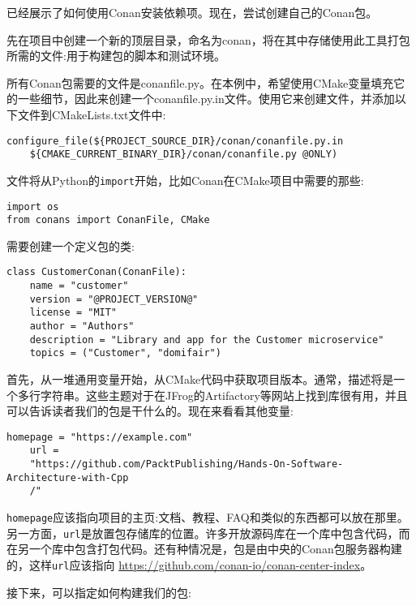 
已经展示了如何使用Conan安装依赖项。现在，尝试创建自己的Conan包。

先在项目中创建一个新的顶层目录，命名为conan，将在其中存储使用此工具打包所需的文件:用于构建包的脚本和测试环境。


所有Conan包需要的文件是conanfile.py。在本例中，希望使用CMake变量填充它的一些细节，因此来创建一个conanfile.py.in文件。使用它来创建文件，并添加以下文件到CMakeLists.txt文件中:

\begin{lstlisting}[style=styleCMake]
configure_file(${PROJECT_SOURCE_DIR}/conan/conanfile.py.in
	${CMAKE_CURRENT_BINARY_DIR}/conan/conanfile.py @ONLY)
\end{lstlisting}

文件将从Python的\texttt{import}开始，比如Conan在CMake项目中需要的那些:

\begin{lstlisting}[style=stylePython]
import os
from conans import ConanFile, CMake
\end{lstlisting}

需要创建一个定义包的类:

\begin{lstlisting}[style=stylePython]
class CustomerConan(ConanFile):
	name = "customer"
	version = "@PROJECT_VERSION@"
	license = "MIT"
	author = "Authors"
	description = "Library and app for the Customer microservice"
	topics = ("Customer", "domifair")
\end{lstlisting}

首先，从一堆通用变量开始，从CMake代码中获取项目版本。通常，描述将是一个多行字符串。这些主题对于在JFrog的Artifactory等网站上找到库很有用，并且可以告诉读者我们的包是干什么的。现在来看看其他变量:

\begin{lstlisting}[style=stylePython]
	homepage = "https://example.com"
	url =
	"https://github.com/PacktPublishing/Hands-On-Software-Architecture-with-Cpp
	/"
\end{lstlisting}

\texttt{homepage}应该指向项目的主页:文档、教程、FAQ和类似的东西都可以放在那里。另一方面，\texttt{url}是放置包存储库的位置。许多开放源码库在一个库中包含代码，而在另一个库中包含打包代码。还有种情况是，包是由中央的Conan包服务器构建的，这样\texttt{url}应该指向 \url{https://github.com/conan-io/conan-center-index}。

接下来，可以指定如何构建我们的包:


